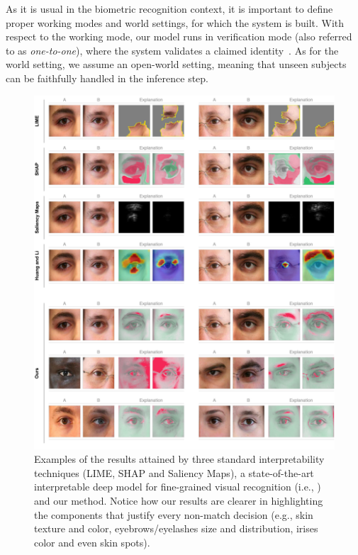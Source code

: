 \documentclass[final]{cvpr}
\begin{document}
 As it is usual in the biometric recognition context, it is important to define proper working modes and world settings, for which the system is built. With respect to the working mode, our model runs in verification mode (also referred to as \textit{one-to-one}), where the system validates a claimed identity~\cite{introduction_to_biometric_recognition}. As for the world setting, we assume an open-world setting, meaning that unseen subjects can be faithfully handled in the inference step.
 
 \begin{figure}
  \begin{center}
  \includegraphics[width=\textwidth]{figures/figure_4.pdf}
  \caption{Examples of the results attained by three standard interpretability techniques (LIME, SHAP and Saliency Maps), a state-of-the-art interpretable deep model for fine-grained visual recognition (i.e., \cite{interpretability_by_parts}) and our method. Notice how our results are clearer in highlighting the components that justify every non-match decision (e.g., skin texture and color, eyebrows/eyelashes size and distribution, irises color and even skin spots).}
  \label{fig:results}
  \end{center}
\end{figure}
\end{document}
